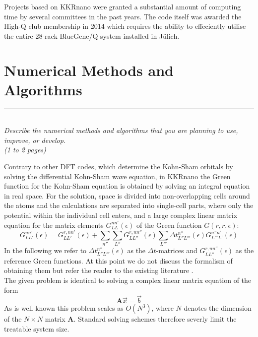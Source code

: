 \documentclass [a4paper, 12pt]{article}
\newcommand{\matr}[1]{\bm{#1}}
\begin{document}
Projects based on KKRnano were
granted a substantial amount of computing time by several committees in the past years.
The code itself was awarded the High-Q club membership in 2014 which requires the ability to
effeciently utilise the entire 28-rack BlueGene/Q system installed in Jülich.




\section{Numerical Methods and Algorithms} 
\rule{\textwidth}{0.4pt}\\
\textit{Describe the numerical methods and algorithms that you are planning to use, improve, or develop.}\\
 
\textit{(1 to 2 pages)}
\bigskip

Contrary to other DFT codes, which determine the Kohn-Sham orbitals by solving
the differential Kohn-Sham wave equation, in KKRnano the Green function for the Kohn-Sham
equation is obtained by solving an integral equation in real space. For the solution, space is divided
into non-overlapping cells around the atoms and the calculations are separated into single-cell parts,
where only the potential within the individual cell enters, and a large complex linear matrix equation for 
the matrix elements $G_{LL}^{nn'} (\epsilon)$ of the Green function $G(r, r , \epsilon)$:
\begin{equation}
	G_{LL'}^{nn'} (\epsilon) = G_{LL'}^{r,nn'} (\epsilon) + \sum_{n''} \sum_{L''}
	G_{LL''}^{r,nn''} (\epsilon) \sum_{L'''} \Delta t_{L'' L'''}^{n''} (\epsilon)
	G_{L'''L'}^{n''n'} (\epsilon)
	\label{eq:dyson_eq}
\end{equation}
In the following we refer to $\Delta t_{L'' L'''}^{n''} (\epsilon)$ as the $\Delta t$-matrices and
$G_{LL''}^{r,nn''} (\epsilon)$ as the reference Green functions. At this point we do not
discuss the formalism of obtaining them but refer the reader to the existing
literature \cite{zeller_towards_2008}.
\\
The given problem is identical to solving a complex linear matrix equation of the form
\begin{equation}
	\matr{A} \vec{x} = \vec{b}
\end{equation}
As is well known this problem scales as $O(N^3)$, where $N$ denotes the dimension of the $N \times N$
matrix $\matr{A}$. Standard solving schemes therefore severly limit the treatable system size.
\end{document}
